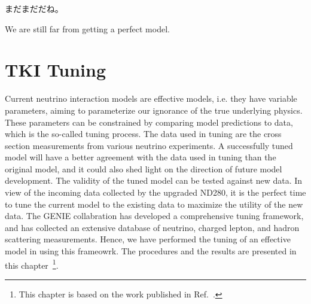 \begin{savequote}[8cm]
\begin{CJK*}{UTF8}{min}
まだまだだね。
\end{CJK*}

We are still far from getting a perfect model.
\end{savequote}

\chapter{\label{ch:tuning}TKI Tuning}

\minitoc

Current neutrino interaction models are effective models, i.e. they have variable parameters, aiming to parameterize our ignorance of the true underlying physics.
These parameters can be constrained by comparing model predictions to data, which is the so-called tuning process.
The data used in tuning are the cross section measurements from various neutrino experiments.
A successfully tuned model will have a better agreement with the data used in tuning than the original model, and it could also shed light on the direction of future model development.
The validity of the tuned model can be tested against new data.
In view of the incoming data collected by the upgraded ND280, it is the perfect time to tune the current model to the existing data to maximize the utility of the new data.
The GENIE collabration has developed a comprehensive tuning framework, and has collected an extensive database of neutrino, charged lepton, and hadron scattering measurements. 
Hence, we have performed the tuning of an effective model in \genie using this frameowrk.
The procedures and the results are presented in this chapter~\footnote{This chapter is based on the work published in Ref.~\cite{GENIE:2024ufm}.}.

